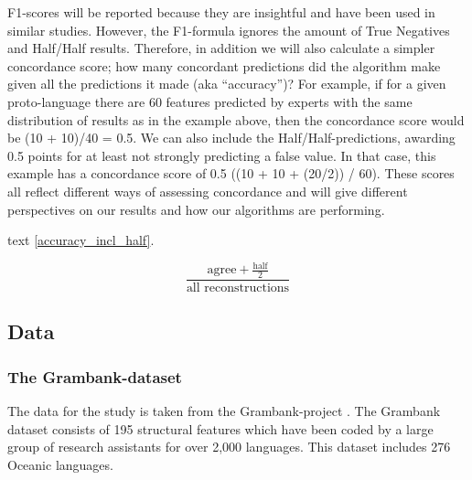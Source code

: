 \documentclass[a4paper,10pt]{article} %
\begin{document}
F1-scores will be reported because they are insightful and have been used in similar studies. However, the F1-formula ignores the amount of True Negatives and Half/Half results. Therefore, in addition we will also calculate a simpler concordance score; how many concordant predictions did the algorithm make given all the predictions it made (aka ``accuracy'')? For example, if for a given proto-language there are 60 features predicted by experts with the same distribution of results as in the example above, then the concordance score would be (10 + 10)/40 = 0.5. We can also include the Half/Half-predictions, awarding 0.5 points for at least not strongly predicting a false value. In that case, this example has a concordance score of 0.5 ((10 + 10 + (20/2)) / 60). These scores all reflect different ways of assessing concordance and will give different perspectives on our results and how our algorithms are performing. %


text \eqref{accuracy_incl_half}.

\begin{equation} \label{accuracy_incl_half}
\frac{\text{agree} + \frac{\text{half}}{2}}{\text{all reconstructions}}
\end{equation}

\subsection{Data}

\subsubsection{The Grambank-dataset}
\label{asr:sec:GBcoverage}

The data for the study is taken from the Grambank-project \citep{grambankwebsite}. The Grambank dataset consists of 195 structural features which have been coded by a large group of research assistants for over 2,000 languages. This dataset includes 276 Oceanic languages. 

\end{document}
